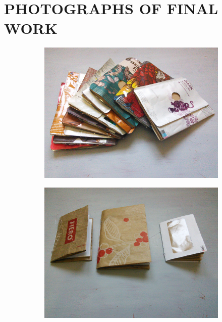 \chapter{PHOTOGRAPHS OF FINAL WORK}


\begin{figure}
    \centering
    \begin{subfigure}[t]{0.47\textwidth}
        \includegraphics[width=\textwidth]{project_graphics/notebooks1.jpg}
    \end{subfigure}
    \begin{subfigure}[t]{0.47\textwidth}
        \includegraphics[width=\textwidth]{project_graphics/notebooks2.jpg}
    \end{subfigure}
    \label{fig:CollectedMaterials1}
\end{figure}